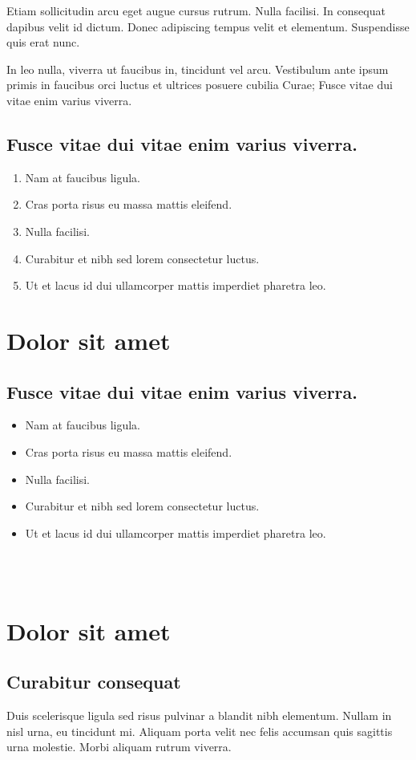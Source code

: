 \documentclass[10pt,landscape]{cheatsheet}
\begin{document}
\begin{multicols}{3}
Etiam
sollicitudin arcu eget augue cursus rutrum. Nulla facilisi. In consequat
dapibus velit id dictum. Donec adipiscing tempus velit et elementum.
Suspendisse quis erat nunc.

In leo nulla, viverra ut faucibus in, tincidunt
vel arcu. Vestibulum ante ipsum primis in faucibus orci luctus et ultrices
posuere cubilia Curae; Fusce vitae dui vitae enim varius viverra.

\subsection{Fusce vitae dui vitae enim varius viverra.}
\begin{enumerate}
\item Nam at faucibus ligula.
\item Cras porta risus eu massa mattis eleifend.
\item Nulla facilisi.
\item Curabitur et nibh sed lorem consectetur luctus.
\item Ut et lacus id dui ullamcorper mattis imperdiet pharetra leo.
\end{enumerate}

\section{Dolor sit amet}
\subsection{Fusce vitae dui vitae enim varius viverra.}
\begin{itemize}
\item Nam at faucibus ligula.
\item Cras porta risus eu massa mattis eleifend.
\item Nulla facilisi.
\item Curabitur et nibh sed lorem consectetur luctus.
\item Ut et lacus id dui ullamcorper mattis imperdiet pharetra leo.
\end{itemize}

~\\~\\
\section{Dolor sit amet}
\subsection{Curabitur consequat}
Duis scelerisque ligula sed risus pulvinar a blandit nibh elementum. Nullam
in nisl urna, eu tincidunt mi. Aliquam porta velit nec felis accumsan quis
sagittis urna molestie. Morbi aliquam rutrum viverra.


\end{multicols}
\end{document}

